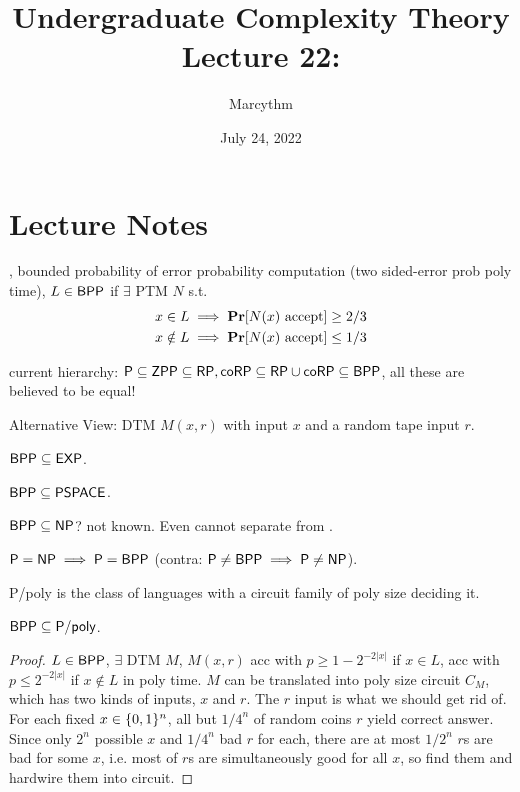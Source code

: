 \documentclass{article}
\title{Undergraduate Complexity Theory \\ Lecture 22: \BPP}
\author{Marcythm}
\date{July 24, 2022}
\begin{document}
\maketitle{}

\section{Lecture Notes}

\begin{definition}
  \BPP, bounded probability of error probability computation (two sided-error prob poly time), \(L \in \text{\sf BPP}\) if \(\exists\) PTM \(N\) s.t.
  \[ \begin{aligned}
    x \in L &\implies \mathop{\bf Pr\/}\lbrack\text{\(N(x)\) accept}\rbrack \geq 2/3 \\
    x \notin L &\implies \mathop{\bf Pr\/}\lbrack\text{\(N(x)\) accept}\rbrack \leq 1/3
  \end{aligned} \]
\end{definition}

current hierarchy: \(\text{\sf P} \subseteq \text{\sf ZPP} \subseteq \text{\sf RP}, \text{\sf coRP} \subseteq \text{\sf RP} \cup \text{\sf coRP} \subseteq \text{\sf BPP}\), all these are believed to be equal!

Alternative View: DTM \(M(x, r)\) with input \(x\) and a random tape input \(r\).

\begin{lemma}
  \(\text{\sf BPP} \subseteq \text{\sf EXP}\).
\end{lemma}

\begin{corollary}
  \(\text{\sf BPP} \subseteq \text{\sf PSPACE}\).
\end{corollary}

\(\text{\sf BPP} \subseteq \text{\sf NP}\)? not known. Even cannot separate \BPP from \NEXP.

\begin{theorem}
  \(\text{\sf P} = \text{\sf NP} \implies \text{\sf P} = \text{\sf BPP}\) (contra: \(\text{\sf P} \neq \text{\sf BPP} \implies \text{\sf P} \neq \text{\sf NP}\)).
\end{theorem}

\begin{definition}
  {\sf P/poly} is the class of languages with a circuit family of poly size deciding it.
\end{definition}

\begin{theorem}
  \(\text{\sf BPP} \subseteq {\sf P/poly}\).
\end{theorem}

\begin{proof}
  \(L \in \text{\sf BPP}\), \(\exists\) DTM \(M\), \(M(x, r)\) acc with \(p \geq 1 - 2^{-2|x|}\) if \(x \in L\), acc with \(p \leq 2^{-2|x|}\) if \(x \notin L\) in poly time.
  \(M\) can be translated into poly size circuit \(C_M\), which has two kinds of inputs, \(x\) and \(r\). The \(r\) input is what we should get rid of. \\
  For each fixed \(x \in \lbrace0, 1\rbrace^n\), all but \(1/4^n\) of random coins \(r\) yield correct answer. Since only \(2^n\) possible \(x\) and \(1/4^n\) bad \(r\) for each, there are at most \(1/2^n\) \(r\)s are bad for some \(x\), i.e. most of \(r\)s are simultaneously good for all \(x\), so find them and hardwire them into circuit.
\end{proof}
\end{document}
